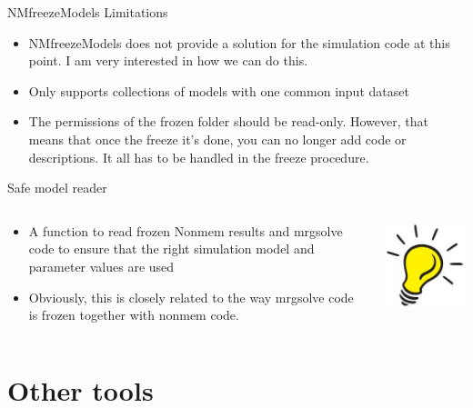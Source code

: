 \documentclass[
  8pt,
  ignorenonframetext,
  aspectratio=169]{beamer}
\providecommand{\tightlist}{%
  \setlength{\itemsep}{0pt}\setlength{\parskip}{0pt}}
\begin{document}
\begin{frame}[fragile]{NMfreezeModels}
Limitations

\begin{itemize}
\tightlist
\item
  NMfreezeModels does not provide a solution for the simulation code at
  this point. I am very interested in how we can do this.
\item
  Only supports collections of models with one common input dataset
\item
  The permissions of the frozen folder should be read-only. However,
  that means that once the freeze it's done, you can no longer add code
  or descriptions. It all has to be handled in the freeze procedure.
\end{itemize}
\end{frame}

\begin{frame}{Safe model reader}
\protect\hypertarget{safe-model-reader}{}
\begin{columns}[T]
\begin{column}{0.85\textwidth}
\begin{itemize}
\item
  A function to read frozen Nonmem results and mrgsolve code to ensure
  that the right simulation model and parameter values are used
\item
  Obviously, this is closely related to the way mrgsolve code is frozen
  together with nonmem code.
\end{itemize}
\end{column}

\begin{column}{0.15\textwidth}
\includegraphics[width=.5in]{figures/ideabulb.jpg}
\end{column}
\end{columns}
\end{frame}

\hypertarget{other-tools}{%
\section{Other tools}\label{other-tools}}
\end{document}
